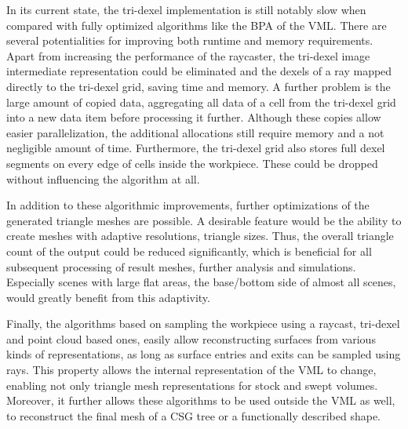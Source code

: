 In its current state, the tri-dexel implementation is still notably slow when compared with fully optimized algorithms like the BPA of the VML.
There are several potentialities for improving both runtime and memory requirements.
Apart from increasing the performance of the raycaster, the tri-dexel image intermediate representation could be eliminated and the dexels of a ray mapped directly to the tri-dexel grid, saving time and memory.
A further problem is the large amount of copied data, \eg aggregating all data of a cell from the tri-dexel grid into a new data item before processing it further.
Although these copies allow easier parallelization, the additional allocations still require memory and a not negligible amount of time.
Furthermore, the tri-dexel grid also stores full dexel segments on every edge of cells inside the workpiece.
These could be dropped without influencing the algorithm at all.

In addition to these algorithmic improvements, further optimizations of the generated triangle meshes are possible.
A desirable feature would be the ability to create meshes with adaptive resolutions, \ie triangle sizes.
Thus, the overall triangle count of the output could be reduced significantly, which is beneficial for all subsequent processing of result meshes, \eg further analysis and simulations.
Especially scenes with large flat areas, \cf the base/bottom side of almost all scenes, would greatly benefit from this adaptivity.

Finally, the algorithms based on sampling the workpiece using a raycast, \ie tri-dexel and point cloud based ones, easily allow reconstructing surfaces from various kinds of representations, as long as surface entries and exits can be sampled using rays.
This property allows the internal representation of the VML to change, enabling not only triangle mesh representations for stock and swept volumes.
Moreover, it further allows these algorithms to be used outside the VML as well, \eg to reconstruct the final mesh of a CSG tree or a functionally described shape.
